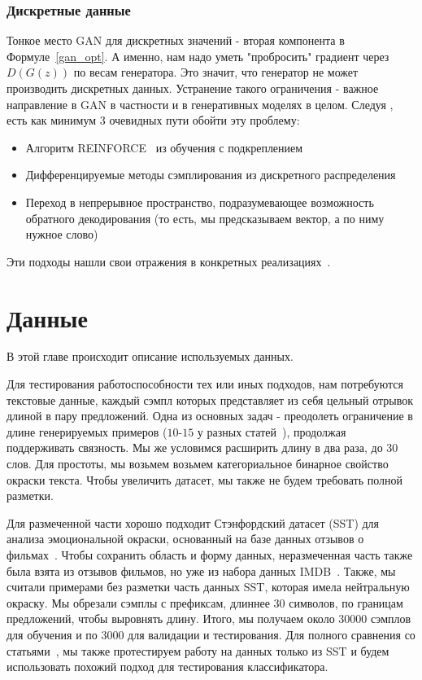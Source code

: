 \documentclass{spbau-diploma}
\begin{document}
\subsubsection{Дискретные данные}
Тонкое место GAN для дискретных значений - вторая компонента в 
Формуле~\ref{gan_opt}. А именно, нам надо уметь "пробросить" градиент через 
$D(G(z))$ по весам генератора. Это значит, что генератор не может производить
дискретных данных. Устранение такого ограничения - важное направление в GAN
в частности и в генеративных моделях в целом. 
Следуя \cite{1701.00160}, есть как минимум 3 очевидных пути обойти эту проблему:
\begin{itemize}
    \item Алгоритм REINFORCE~\cite{reinforce} из обучения с подкреплением
    \item Дифференцируемые методы сэмплирования из дискретного распределения~\cite{1611.00712, 1611.01144}
    \item Переход в непрерывное пространство, подразумевающее возможность 
    обратного декодирования (то есть, мы предсказываем вектор, а по ниму нужное
    слово)
\end{itemize}
Эти подходы нашли свои отражения в конкретных 
реализациях~\cite{seqgan, leakgan, gsgan}.

\section{Данные}
В этой главе происходит описание используемых данных.

Для тестирования работоспособности тех или иных подходов, нам потребуются 
текстовые данные, каждый сэмпл которых представляет из себя цельный отрывок
длиной в пару предложений. Одна из основных задач - преодолеть ограничение в 
длине генерируемых примеров ($10$-$15$ у разных статей~\cite{text_vae}), 
продолжая поддерживать связность. Мы же условимся расширить длину в два раза, до 
$30$ слов. Для простоты, мы возьмем возьмем категориальное бинарное свойство 
окраски текста. Чтобы увеличить датасет, мы также не будем требовать полной 
разметки.

Для размеченной части хорошо подходит Стэнфордский датасет (SST) для анализа 
эмоциональной окраски, основанный на базе данных отзывов о фильмах~\cite{sst}.
Чтобы сохранить область и форму данных, неразмеченная часть также была взята
из отзывов фильмов, но уже из набора данных IMDB~\cite{imdb}. Также, мы считали 
примерами без разметки часть данных SST, которая имела нейтральную окраску. Мы 
обрезали сэмплы с префиксам, длиннее $30$ символов, по границам предложений, 
чтобы выровнять длину.
Итого, мы получаем около $30000$ сэмплов для обучения и по $3000$ для валидации 
и тестирования. Для полного сравнения со статьями~\cite{text_vae, text_cvae}, 
мы также протестируем работу на данных только из SST и будем использовать 
похожий подход для тестирования классификатора.
\end{document}
